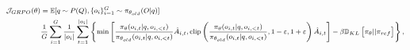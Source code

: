 \begin{equation}
\footnotesize
\begin{split}
    \mathcal{J}_{GRPO}(\theta) &= \mathbb{E}{[q \sim P(Q), \{o_i\}_{i=1}^G \sim \pi_{\theta_{old}}(O|q)]}  \\
    & \frac{1}{G}\sum_{i=1}^G\frac{1}{|o_i|} \sum_{t=1}^{|o_i|} \left\{ \min \left[ \frac{\pi_\theta(o_{i,t} | q, o_{i,<t})}{\pi_{\theta_{old}}(o_{i,t} | q, o_{i,<t})} \hat{A}_{i,t}, \text{clip} \left( \frac{\pi_\theta(o_{i,t} | q, o_{i,<t})}{\pi_{\theta_{old}}(o_{i,t} | q, o_{i,<t})}, 1 - \varepsilon, 1 + \varepsilon \right)  \hat{A}_{i,t} \right] - \beta \mathbb{D}_{KL}\left[\pi_{\theta} || \pi_{ref}\right]\right\} ,
\end{split}
\label{eq:GRPO-obj}
\end{equation}

